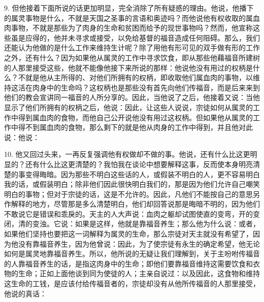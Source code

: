9. 但他接着下面所说的话更加明显，完全消除了所有疑惑的理由。他说，他播下的属灵事物是什么，不就是天国之圣事的言语和奥迹吗？而他说他有权收取的属血肉事物，不就是那些为了肉身的生命和贫困而给予的现世事物吗？然而，他宣称这些虽是应得的，他并未寻求或接受，以免给基督的福音造成任何阻碍。那么，我们还能认为他做的是什么工作来维持生计呢？除了用他有形可见的双手做有形的工作之外，还有什么？因为如果他从属灵的工作中寻求饮食，即从那些他藉福音所建树的人那里接受这些，他就不能像他接下来所说的那样：他说他没有用过的权柄是什么？不就是他从主所得的、对他们所拥有的权柄，即收取他们属血肉的事物，以维持这活在肉身中的生命吗？这权柄也是那些没有首先向他们传福音，而是后来来到他们的教会宣讲同一福音的人所分享的。因此，当他说了之后，他接着又说：当他显示了他们所拥有的权柄之后，他说：因此，让这些人说说，宗徒如何从属灵的工作中得到属血肉的食物，而他自己公开说他没有用过这权柄。但如果他从属灵的工作中得不到属血肉的食物，那么剩下的就是他从肉身的工作中得到，并且他对此说：他说：\par

10. 他又回过头来，一再反复强调他有权做却不做的事。他说，还有什么比这更明显的？还有什么比这更清楚的？我怕我在谈论中想要解释这事，反而使本身明亮清楚的事变得晦暗。因为那些不明白这些话的人，或假装不明白的人，更不容易明白我的话，或假装明白；除非他们因此很快明白我们的，那是因为他们允许自己嘲笑明白的事物；但对于宗徒的话，这是不允许的。因此，凡他们不能按自己的意思另作解释的地方，尽管那是多么清楚明白，他们却回答说那是晦暗不明的，因为他们不敢说它是错误和乖戾的。天主的人大声说：血肉之躯却试图使直的变弯，开的变闭，清的变浊。它说：如果是这样，他就是靠福音养生；那么他为什么说：或者，如果他们坚持也要把这一词解释为属灵的生命，那么宗徒对天主就没有希望了，因为他没有靠福音养生，因为他曾说：因此，为了使宗徒有永生的确定希望，他无论如何是属灵地靠福音养生。所以，他所说的无疑让我们理解到，关于主吩咐传福音的人靠福音养生的话，是指这肉身中的生命；即他们要靠福音维持这需要饮食和衣物的生命；正如上面他谈到同为使徒的人；主亲自说过：以及因此，这食物和维持这生命的工钱，是应该付给传福音者的，宗徒却没有从他所传福音的人那里接受，他说的真话：\par

